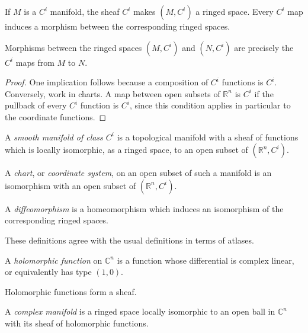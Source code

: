 If $M$ is a $C^i$ manifold, the sheaf
$C^i$ makes $(M,C^i)$ a ringed space. Every
$C^i$ map induces a morphism between the
corresponding ringed spaces.

\begin{proposition}
\label{proposition-smooth-ringed-maps}
Morphisms between the ringed spaces
$(M,C^i)$ and $(N,C^i)$ are precisely the
$C^i$ maps from $M$ to $N$.
\end{proposition}

\begin{proof}
One implication follows because a
composition of $C^i$ functions is $C^i$.
Conversely, work in charts. A map between
open subsets of $\mathbb{R}^n$ is $C^i$ if
the pullback of every $C^i$ function is
$C^i$, since this condition applies in
particular to the coordinate functions.
\end{proof}

\begin{definition}
\label{definition-smooth-ringed-manifold}
A {\it smooth manifold of class $C^i$} is a
topological manifold with a sheaf of
functions which is locally isomorphic, as a
ringed space, to an open subset of
$(\mathbb{R}^n,C^i)$.
\end{definition}

\begin{definition}
\label{definition-chart-ringed}
A {\it chart}, or
{\it coordinate system}, on an open subset
of such a manifold is an isomorphism with
an open subset of $(\mathbb{R}^n,C^i)$.
\end{definition}

\begin{definition}
\label{definition-diffeomorphism-ringed}
A {\it diffeomorphism} is a homeomorphism
which induces an isomorphism of the
corresponding ringed spaces.
\end{definition}

These definitions agree with the usual
definitions in terms of atlases.

\begin{definition}
\label{definition-holomorphic-function-cn}
A {\it holomorphic function} on
$\mathbb{C}^n$ is a function whose
differential is complex linear, or
equivalently has type $(1,0)$.
\end{definition}

Holomorphic functions form a sheaf.

\begin{definition}
\label{definition-complex-manifold-ringed}
A {\it complex manifold} is a ringed space
locally isomorphic to an open ball in
$\mathbb{C}^n$ with its sheaf of
holomorphic functions.
\end{definition}

